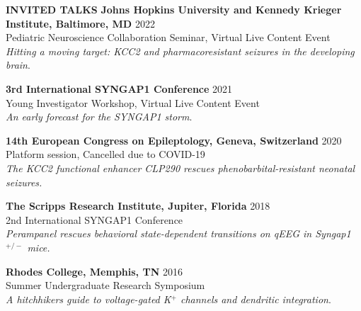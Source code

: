 \documentclass{resume} %
\begin{document}
\begin{rSection}{{\bfseries INVITED TALKS}}
    {\bfseries Johns Hopkins University and Kennedy Krieger Institute, Baltimore, MD} \hfill {2022} 
   \\ Pediatric Neuroscience Collaboration Seminar, Virtual Live Content Event
   \\ \emph{Hitting a moving target: KCC2 and pharmacoresistant seizures in the developing brain}.
   \item  {\bfseries 3rd International SYNGAP1 Conference} \hfill {2021}
   \\ Young Investigator Workshop, Virtual Live Content Event
   \\ \emph{An early forecast for the SYNGAP1 storm}.
   \item {\bfseries 14th European Congress on Epileptology, Geneva, Switzerland} \hfill{2020}
    \\  Platform session, Cancelled due to COVID-19
    \\ \emph{The KCC2 functional enhancer CLP290 rescues phenobarbital-resistant neonatal seizures.}
    \item {\bfseries The Scripps Research Institute, Jupiter, Florida} \hfill{2018}
    \\ 2nd International SYNGAP1 Conference
    \\ \emph{Perampanel rescues behavioral state-dependent transitions on qEEG in Syngap1$^{+/-}$ mice.} \vspace{0.3\baselineskip}
    \item {\bfseries Rhodes College, Memphis, TN} \hfill{2016}
    \\ Summer Undergraduate Research Symposium
    \\ \emph{A hitchhikers guide to voltage-gated K$^+$  channels and dendritic integration}.
\end{rSection}
\end{document}
